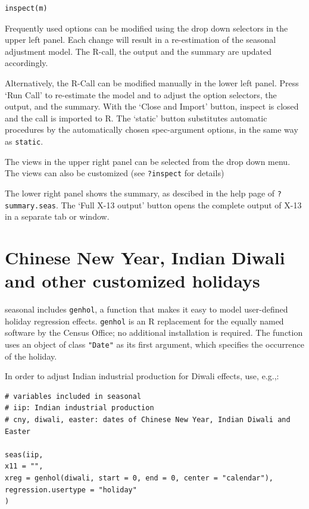 \begin{verbatim}
inspect(m)
\end{verbatim}

Frequently used options can be modified using the drop down selectors in
the upper left panel. Each change will result in a re-estimation of the
seasonal adjustment model. The R-call, the output and the summary are
updated accordingly.

Alternatively, the R-Call can be modified manually in the lower left
panel. Press `Run Call' to re-estimate the model and to adjust the
option selectors, the output, and the summary. With the `Close and
Import' button, inspect is closed and the call is imported to R. The
`static' button substitutes automatic procedures by the automatically
chosen spec-argument options, in the same way as \texttt{static}.

The views in the upper right panel can be selected from the drop down
menu. The views can also be customized (see \texttt{?inspect} for
details)

The lower right panel shows the summary, as descibed in the help page of
\texttt{?summary.seas}. The `Full X-13 output' button opens the complete
output of X-13 in a separate tab or window.

\section{Chinese New Year, Indian Diwali and other customized
holidays}\label{chinese-new-year-indian-diwali-and-other-customized-holidays}

seasonal includes \texttt{genhol}, a function that makes it easy to
model user-defined holiday regression effects. \texttt{genhol} is an R
replacement for the equally named software by the Census Office; no
additional installation is required. The function uses an object of
class \texttt{"Date"} as its first argument, which specifies the
occurrence of the holiday.

In order to adjust Indian industrial production for Diwali effects, use,
e.g.,:

\begin{verbatim}
# variables included in seasonal
# iip: Indian industrial production
# cny, diwali, easter: dates of Chinese New Year, Indian Diwali and Easter

seas(iip, 
x11 = "",
xreg = genhol(diwali, start = 0, end = 0, center = "calendar"), 
regression.usertype = "holiday"
)
\end{verbatim}

